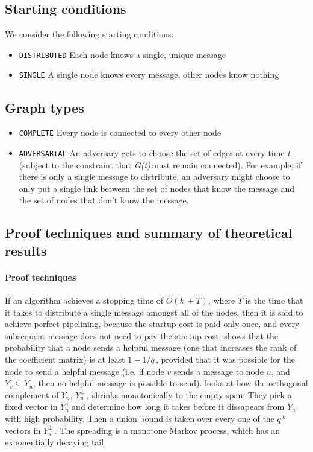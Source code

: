 \documentclass{article} %
\def\graph{\textit{G(t)}\,}
\def\graphtime{\textit{t}\,}
\def\numMessages{\textit{k}\,}
\def\fieldSize{\textit{q}\,}
\def\dualSpace{$Y_u^{\perp}$\,}
\begin{document}
\subsection{Starting conditions}\label{subsec:startingconditions}
We consider the following starting conditions:
\begin{itemize}
\item \texttt{DISTRIBUTED} Each node knows a single, unique message
\item \texttt{SINGLE} A single node knows every message, other nodes know nothing
\end{itemize}

\subsection{Graph types}
\begin{itemize}
\item \texttt{COMPLETE} Every node is connected to every other node
\item \texttt{ADVERSARIAL} An adversary gets to choose the set of edges at every time \graphtime (subject to the constraint that \graph must remain connected). For example, if there is only a single message to distribute, an adversary might choose to only put a single link between the set of nodes that know the message and the set of nodes that don't know the message. 
\end{itemize}

\subsection{Proof techniques and summary of theoretical results}
\paragraph{Proof techniques}
If an algorithm achieves a stopping time of $O(\numMessages + T)$, where $T$ is the time that it takes to distribute a single message amongst all of the nodes, then it is said to achieve perfect pipelining, because the startup cost is paid only once, and every subsequent message does not need to pay the startup cost.
\cite{deb2006algebraic} shows that the probability that a node sends a helpful message (one that increases the rank of the coefficient matrix) is at least $1 - 1/\fieldSize$, provided that it was possible for the node to send a helpful message (i.e. if node $v$ sends a message to node $u$, and $Y_v \subseteq Y_u$, then no helpful message is possible to send). 
\cite{haeupler2011analyzing} looks at how the orthogonal complement of $Y_u$, \dualSpace, shrinks monotonically to the empty span. They pick a fixed vector in \dualSpace and determine how long it takes before it dissapears from $Y_u$ with high probability. Then a union bound is taken over every one of the $\fieldSize^{\numMessages}$ vectors in \dualSpace. The spreading is a monotone Markov process, which has an exponentially decaying tail. 
\end{document}
